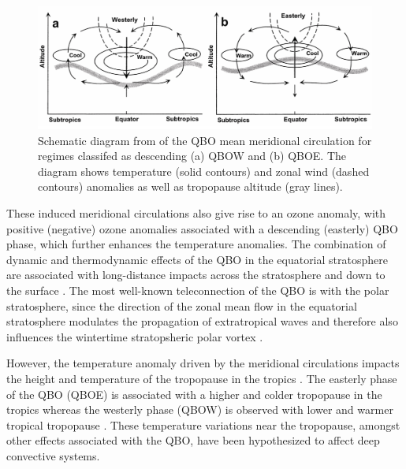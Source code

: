 \begin{figure}[t!]
\centering
\includegraphics[width=0.85\linewidth]{figures/collimore2003}
\caption[QBO meridional circulation]{Schematic diagram from \cite{collimore2003} of the QBO mean meridional circulation for regimes classifed as descending (a) QBOW and (b) QBOE. The diagram shows temperature (solid contours) and zonal wind (dashed contours) anomalies as well as  tropopause altitude (gray lines).  }
\label{fig:collimore}
\end{figure}  

These induced meridional circulations also give rise to an ozone anomaly, with positive (negative) ozone anomalies associated with a descending  (easterly) QBO phase, which further enhances the temperature anomalies.
The combination of dynamic and thermodynamic effects of the QBO in the equatorial stratosphere are associated with long-distance impacts across the stratosphere \citep{holton1980,lu2020} and down to the surface \citep{garfinkel2010,gray2018}. The most well-known teleconnection of the QBO is with the polar stratosphere, since the direction of the zonal mean flow in the equatorial stratosphere modulates the propagation of extratropical waves and therefore also influences the wintertime stratopsheric polar vortex \citep{lu2020}.

However, the temperature anomaly driven by the meridional circulations impacts the height and temperature of the tropopause in the tropics \citep{baldwin2001,tegtmeier2020,tegtmeier2020b}. 
The easterly phase of the QBO (QBOE) is associated with a higher and colder tropopause in the tropics whereas the westerly phase (QBOW) is observed with lower and warmer tropical tropopause \citep{tegtmeier2020}. These temperature variations near the tropopause, amongst other effects associated with the QBO, have been hypothesized to affect deep convective systems.  

